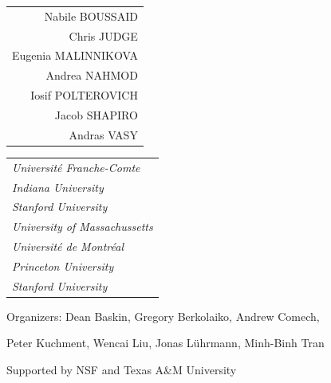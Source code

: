 \documentclass[a3,portrait]{a0poster}
\begin{document}
\bf
\normalsize
\Large
\hskip -1.9cm
\begin{tabular}{r}
Nabile BOUSSAID
\\
Chris JUDGE
\\
Eugenia MALINNIKOVA
\\
Andrea NAHMOD
\\
Iosif POLTEROVICH
\\
Jacob SHAPIRO
\\
Andras VASY
\end{tabular}
\begin{tabular}{l}
\it
Universit\'{e} Franche-Comte
\\
\it
Indiana University
\\
\it
Stanford University
\\
\it
University of Massachussetts
\\
\it
Universit\'{e} de Montr\'{e}al
\\
\it
Princeton University
\\
\it
Stanford University
\end{tabular}


\vskip 3cm

\color{MidnightBlue}

\normalsize

{\bsifamily Organizers:}
Dean Baskin, Gregory Berkolaiko, Andrew Comech,

Peter Kuchment,
Wencai Liu, Jonas L\"{u}hrmann, Minh-Binh Tran


\vskip 0.5cm

\hskip 4cm
Supported by NSF and
Texas A\&M University


\vskip 1cm

\hskip 11.7cm
\mbox{
\normalsize
}


\vskip -16mm
\end{document}
